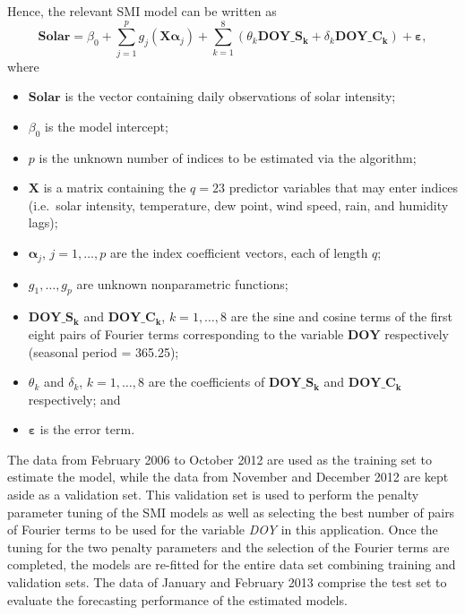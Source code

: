 \documentclass[
  11pt,
  a4paper,
]{report}
\providecommand{\tightlist}{%
  \setlength{\itemsep}{0pt}\setlength{\parskip}{0pt}}\usepackage{longtable,booktabs,array}
\begin{document}
Hence, the relevant SMI model can be written as \[
  \textbf{Solar} = \beta_{0} + \sum_{j = 1}^{p}{g_{j}(\bm{X}\bm{\alpha}_{j})} + \sum_{k = 1}^{8}(\theta_{k}\textbf{DOY}\_\textbf{S}_{\bm{k}} + \delta_{k}\textbf{DOY}\_\textbf{C}_{\bm{k}}) + \bm{\varepsilon},
\] where

\begin{itemize}
\tightlist
\item
  \(\textbf{Solar}\) is the vector containing daily observations of
  solar intensity;
\item
  \(\beta_{0}\) is the model intercept;
\item
  \(p\) is the unknown number of indices to be estimated via the
  algorithm;
\item
  \(\bm{X}\) is a matrix containing the \(q=23\) predictor variables
  that may enter indices (i.e.~solar intensity, temperature, dew point,
  wind speed, rain, and humidity lags);
\item
  \(\bm{\alpha}_{j}\), \(j = 1, \dots, p\) are the index coefficient
  vectors, each of length \(q\);
\item
  \(g_{1}, \dots, g_{p}\) are unknown nonparametric functions;
\item
  \(\textbf{DOY}\_\textbf{S}_{\bm{k}}\) and
  \(\textbf{DOY}\_\textbf{C}_{\bm{k}}\), \(k = 1, \dots, 8\) are the
  sine and cosine terms of the first eight pairs of Fourier terms
  corresponding to the variable \(\textbf{DOY}\) respectively (seasonal
  period = 365.25);
\item
  \(\theta_{k}\) and \(\delta_{k}\), \(k = 1, \dots, 8\) are the
  coefficients of \(\textbf{DOY}\_\textbf{S}_{\bm{k}}\) and
  \(\textbf{DOY}\_\textbf{C}_{\bm{k}}\) respectively; and
\item
  \(\bm{\varepsilon}\) is the error term.
\end{itemize}

The data from February 2006 to October 2012 are used as the training set
to estimate the model, while the data from November and December 2012
are kept aside as a validation set. This validation set is used to
perform the penalty parameter tuning of the SMI models as well as
selecting the best number of pairs of Fourier terms to be used for the
variable \emph{DOY} in this application. Once the tuning for the two
penalty parameters and the selection of the Fourier terms are completed,
the models are re-fitted for the entire data set combining training and
validation sets. The data of January and February 2013 comprise the test
set to evaluate the forecasting performance of the estimated models.
\end{document}
